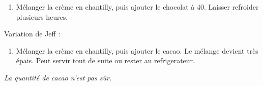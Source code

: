 
\begin{ingredients}
\end{ingredients}


\begin{recipe}
  \begin{enumerate}

  \item M\'elanger la cr\`eme en chantilly, puis ajouter le chocolat
    \`a 40\C.  Laisser refroider plusieurs heures.

  \end{enumerate}

\end{recipe}


Variation de Jeff :

\begin{ingredients}
\end{ingredients}


\begin{recipe}
  \begin{enumerate}

  \item M\'elanger la cr\`eme en chantilly, puis ajouter le cacao.  Le
    m\'elange devient tr\`es \'epais.  Peut servir tout de suite ou
    rester au refrigerateur.

  \end{enumerate}

  \textit{La quantit\'e de cacao n'est pas s\^ur.}
  
\end{recipe}
